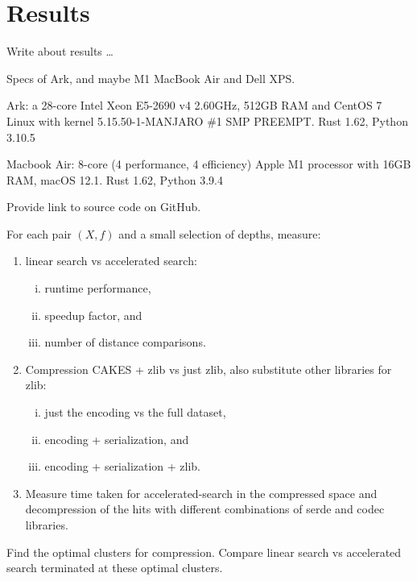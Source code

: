 \section{Results}
\label{sec:results}

Write about results \dots

Specs of Ark, and maybe M1 MacBook Air and Dell XPS.

Ark: a 28-core Intel Xeon E5-2690 v4 2.60GHz, 512GB RAM and CentOS 7 Linux with kernel 5.15.50-1-MANJARO \#1 SMP PREEMPT. Rust 1.62, Python 3.10.5

Macbook Air: 8-core (4 performance, 4 efficiency) Apple M1 processor with 16GB RAM, macOS 12.1. Rust 1.62, Python 3.9.4

Provide link to source code on GitHub.

For each pair $(X, f)$ and a small selection of depths, measure:
\begin{enumerate}[1.]
    \item linear search vs accelerated search:
    \begin{enumerate}[i.]
        \item runtime performance,
        \item speedup factor, and
        \item number of distance comparisons.
    \end{enumerate}
    \item Compression CAKES + zlib vs just zlib, also substitute other libraries for zlib:
    \begin{enumerate}[i.]
        \item just the encoding vs the full dataset,
        \item encoding + serialization, and
        \item encoding + serialization + zlib.
    \end{enumerate}
    \item Measure time taken for accelerated-search in the compressed space and decompression of the hits with different combinations of serde and codec libraries.
\end{enumerate}

Find the optimal clusters for compression.
Compare linear search vs accelerated search terminated at these optimal clusters.
